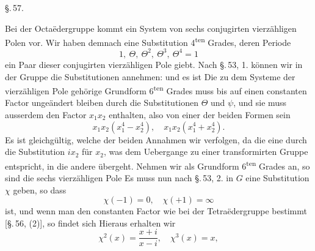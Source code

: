 
\begin{center}
\S.\,57.

\end{center}

Bei der Octaëdergruppe kommt ein System von sechs conjugirten
vierzähligen Polen vor. Wir haben demnach eine Substitution
4\textsuperscript{ten} Grades, deren Periode
\[
1, \ \Theta, \ \Theta^2, \ \Theta^3, \ \Theta^4 = 1
\]
ein Paar dieser conjugirten vierzähligen Pole giebt. Nach \S.\,53, 1.
können wir in der Gruppe die Substitutionen annehmen:
und es ist
Die zu dem Systeme der vierzähligen Pole gehörige Grundform
6\textsuperscript{ten} Grades muss bis auf einen constanten Factor
ungeändert bleiben durch die Substitutionen $\Theta$ und $\psi$, und
sie muss ausserdem den Factor $x_1x_2$ enthalten, also von einer der
beiden Formen sein
\[
x_1x_2(x_1^4 - x_2^4), \quad x_1x_2(x_1^4 + x_2^4).
\]
Es ist gleichgültig, welche der beiden Annahmen wir verfolgen, da
die eine durch die Substitution $ix_2$ für $x_2$, was dem Uebergange
zu einer transformirten Gruppe entspricht, in die andere übergeht.
Nehmen wir
als Grundform 6\textsuperscript{ten} Grades an, so sind die sechs
vierzähligen Pole
Es muss nun nach \S.\,53, 2. in $G$ eine Substitution $\chi$ geben,
so dass
\[
\chi(-1) = 0, \quad \chi(+1) = \infty
\]
ist, und wenn man den constanten Factor wie bei der Tetraëdergruppe
bestimmt [\S.\,56, (2)], so findet sich
Hieraus erhalten wir
\[
\chi^2(x) = \frac{x+i}{x-i}, \quad \chi^3(x) = x,
\]
